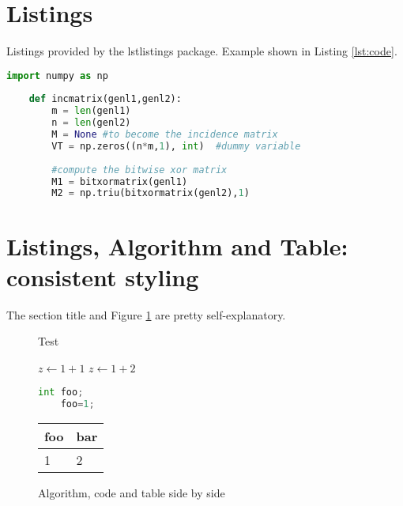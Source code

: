 \section{Listings}
Listings provided by the lstlistings package. Example shown in Listing \ref{lst:code}. \blindtext[2]
\begin{lstlisting}[language=Python,float,caption=Python example,label={lst:code},basicstyle=\ttfamily,frame=b,framextopmargin=.2ex]
    import numpy as np
     
    def incmatrix(genl1,genl2):
        m = len(genl1)
        n = len(genl2)
        M = None #to become the incidence matrix
        VT = np.zeros((n*m,1), int)  #dummy variable
     
        #compute the bitwise xor matrix
        M1 = bitxormatrix(genl1)
        M2 = np.triu(bitxormatrix(genl2),1) 
\end{lstlisting}


\section{Listings, Algorithm and Table: consistent styling}
The section title and Figure \ref{fig:figure} are pretty self-explanatory.\Blindtext
\begin{figure}\centering
\begin{minipage}[t]{.3\textwidth}
\begin{algorithm}[H]
    \caption{Test}
    \begin{algorithmic}[1]
        \State $z\gets 1+1$
        \State $z\gets 1+2$
    \end{algorithmic}
\end{algorithm}
\end{minipage}\hfill
\begin{minipage}[t]{.3\textwidth}%
    \vspace{.7em}
    \begin{lstlisting}[language=Python,caption=ex]
    int foo;
    foo=1;
    \end{lstlisting}
\end{minipage}\hfill%
\begin{minipage}[t]{.3\textwidth}
\begin{table}[H]
    \begin{tabular}{ll}
        \toprule
        foo & bar \\
        \midrule 
        1 & 2 \\
        \bottomrule
    \end{tabular}
\end{table}
\end{minipage}
\caption{Algorithm, code and table side by side}\label{fig:figure}
\end{figure}